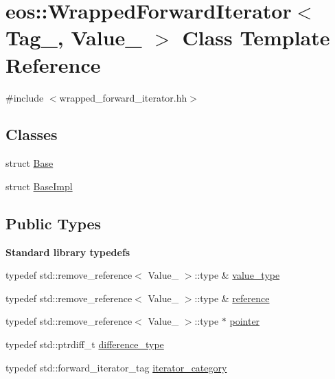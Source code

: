 \hypertarget{classeos_1_1WrappedForwardIterator}{
\section{eos::WrappedForwardIterator$<$ Tag\_\-, Value\_\- $>$ Class Template Reference}
\label{classeos_1_1WrappedForwardIterator}
}


{\ttfamily \#include $<$wrapped\_\-forward\_\-iterator.hh$>$}\subsection*{Classes}
\begin{DoxyCompactItemize}
\item 
struct \hyperlink{structeos_1_1WrappedForwardIterator_1_1Base}{Base}
\item 
struct \hyperlink{structeos_1_1WrappedForwardIterator_1_1BaseImpl}{BaseImpl}
\end{DoxyCompactItemize}
\subsection*{Public Types}
\begin{Indent}{\bf Standard library typedefs}\par
{\em \label{_amgrpbf913aaa4179804ab842d74a2daf0c46}
 }\begin{DoxyCompactItemize}
\item 
typedef std::remove\_\-reference$<$ Value\_\- $>$::type \& \hyperlink{classeos_1_1WrappedForwardIterator_a89335178f8e6e7a0a48ef7a5001498ed}{value\_\-type}
\item 
typedef std::remove\_\-reference$<$ Value\_\- $>$::type \& \hyperlink{classeos_1_1WrappedForwardIterator_ac7ba4ace12142ac73d97df5d555a4c18}{reference}
\item 
typedef std::remove\_\-reference$<$ Value\_\- $>$::type $\ast$ \hyperlink{classeos_1_1WrappedForwardIterator_addb7c63e8b8d4be0a65ded32a4cb7cb9}{pointer}
\item 
typedef std::ptrdiff\_\-t \hyperlink{classeos_1_1WrappedForwardIterator_af3705260b81ff899661f7f77f25c72e2}{difference\_\-type}
\item 
typedef std::forward\_\-iterator\_\-tag \hyperlink{classeos_1_1WrappedForwardIterator_ade461e57f6b6527039eecb200bf53c85}{iterator\_\-category}
\end{DoxyCompactItemize}
\end{Indent}
